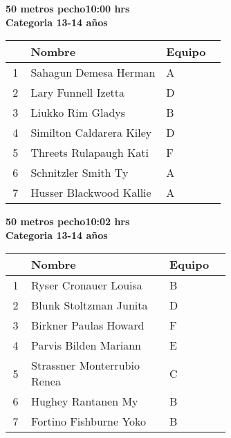 \begin{minipage}{0.95\linewidth}\vspace{0.5cm} 
\begin{flushleft}
\textbf{
\hspace{-0.15cm}50 metros pecho\hspace{1.5cm}10:00 hrs \\Categoria 13-14 años}\vspace{-0.2cm} 
\end{flushleft}
\begin{tabular}{cp{0.63\linewidth}l}
\hline
& \textbf{Nombre} & \textbf{Equipo} \\ \hline
1 & Sahagun Demesa Herman & A \\ 
2 & Lary Funnell Izetta & D \\ 
3 & Liukko Rim Gladys & B \\ 
4 & Similton Caldarera Kiley & D \\ 
5 & Threets Rulapaugh Kati & F \\ 
6 & Schnitzler Smith Ty & A \\ 
7 & Husser Blackwood Kallie & A \\ 
\end{tabular}
\end{minipage}
\begin{minipage}{0.95\linewidth}\vspace{0.5cm} 
\begin{flushleft}
\textbf{
\hspace{-0.15cm}50 metros pecho\hspace{1.5cm}10:02 hrs \\Categoria 13-14 años}\vspace{-0.2cm} 
\end{flushleft}
\begin{tabular}{cp{0.63\linewidth}l}
\hline
& \textbf{Nombre} & \textbf{Equipo} \\ \hline
1 & Ryser Cronauer Louisa & B \\ 
2 & Blunk Stoltzman Junita & D \\ 
3 & Birkner Paulas Howard & F \\ 
4 & Parvis Bilden Mariann & E \\ 
5 & Strassner Monterrubio Renea & C \\ 
6 & Hughey Rantanen My & B \\ 
7 & Fortino Fishburne Yoko & B \\ 
\end{tabular}
\end{minipage}

